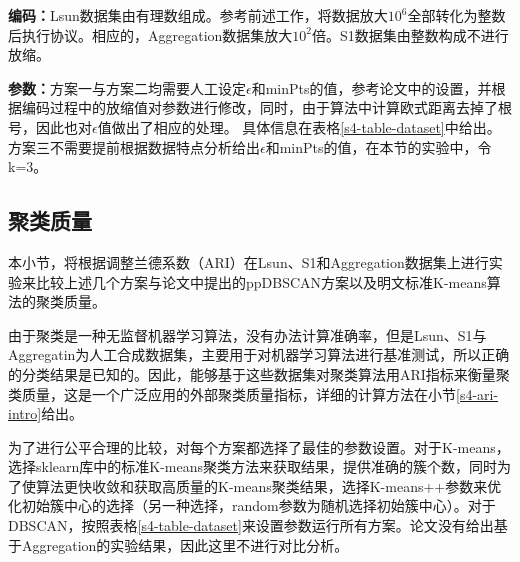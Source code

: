 \textbf{编码：}Lsun数据集由有理数组成。参考前述工作\cite{jaschke2019unsupervised}，将数据放大$ 10^6 $全部转化为整数后执行协议。相应的，Aggregation数据集放大$ 10^2 $倍。S1数据集由整数构成不进行放缩。

\textbf{参数：}方案一与方案二均需要人工设定$\epsilon$和minPts的值，参考论文\cite{bozdemir2021privacy}中的设置，并根据编码过程中的放缩值对参数进行修改，同时，由于算法中计算欧式距离去掉了根号，因此也对$\epsilon$值做出了相应的处理。
具体信息在表格\ref{s4-table-dataset}中给出。
方案三不需要提前根据数据特点分析给出$\epsilon$和minPts的值，在本节的实验中，令k=3。

\begin{table}[htbp]
	\centering
	\renewcommand{\arraystretch}{1.3}
	\caption{数据集具体信息}
	\label{s4-table-dataset}
\end{table}

\subsection{聚类质量}
本小节，将根据调整兰德系数（ARI）在Lsun、S1和Aggregation数据集上进行实验来比较上述几个方案与论文\cite{bozdemir2021privacy}中提出的ppDBSCAN方案以及明文标准K-means算法的聚类质量。

由于聚类是一种无监督机器学习算法，没有办法计算准确率，但是Lsun、S1与Aggregatin为人工合成数据集，主要用于对机器学习算法进行基准测试，所以正确的分类结果是已知的。因此，能够基于这些数据集对聚类算法用ARI指标来衡量聚类质量，这是一个广泛应用的外部聚类质量指标\cite{vinh2009information,arbelaitz2013extensive}，详细的计算方法在小节\ref{s4-ari-intro}给出。

为了进行公平合理的比较，对每个方案都选择了最佳的参数设置。对于K-means，选择sklearn库中的标准K-means聚类方法\cite{buitinck2013api}来获取结果，提供准确的簇个数，同时为了使算法更快收敛和获取高质量的K-means聚类结果，选择K-means++参数来优化初始簇中心的选择（另一种选择，random参数为随机选择初始簇中心）。对于DBSCAN，按照表格\ref{s4-table-dataset}来设置参数运行所有方案。论文\cite{bozdemir2021privacy}没有给出基于Aggregation的实验结果，因此这里不进行对比分析。

